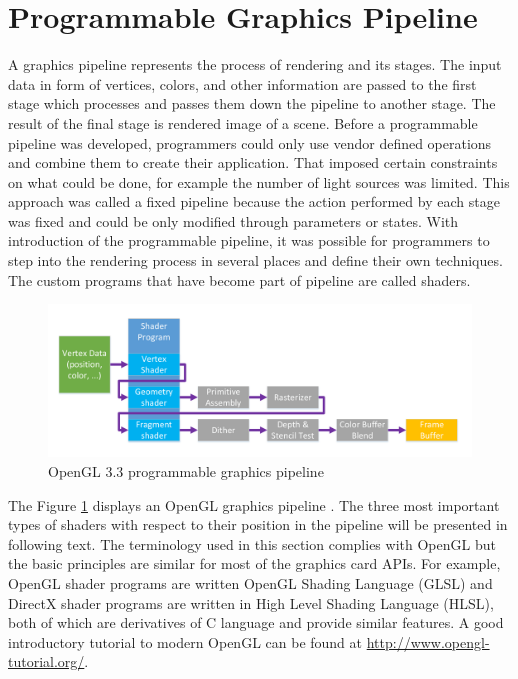 \section{Programmable Graphics Pipeline}
\label{sec:pipeline}
A graphics pipeline represents the process of rendering and its stages. The
input data in form of vertices, colors, and other information are passed to the
first stage which processes and passes them down the pipeline to another stage.
The result of the final stage is rendered image of a scene. Before a programmable
pipeline was developed, programmers could only use vendor defined operations and
combine them to create their application. That imposed certain constraints on
what could be done, for example the number of light sources was limited. This approach
was called a fixed pipeline because the action performed by each stage was fixed and could be only modified through parameters
or states. With introduction of the programmable pipeline, it was possible for
programmers to step into the rendering process in several places and define their
own techniques. The custom programs that have become part of pipeline are called
shaders. 
\begin{figure}[htb]
	\centering
	\includegraphics[width=1\linewidth]{fig/OpenGLpipeline.pdf}
	\caption{OpenGL 3.3 programmable graphics pipeline \cite{OpenGL}}
	\label{fig:OpenGLPipeline}
\end{figure}
The Figure \ref{fig:OpenGLPipeline} displays an OpenGL graphics pipeline \cite{OpenGL}. The three most important types of
shaders with respect to their position in the pipeline will be presented in following text. The terminology used in this section complies with OpenGL but the basic principles are similar for most of the graphics card APIs. For example, OpenGL shader programs are written OpenGL Shading Language (GLSL) and DirectX shader programs are written in High Level Shading Language (HLSL), both of which are derivatives of C language and provide similar features. A good introductory tutorial to modern OpenGL can be found at \url{http://www.opengl-tutorial.org/}.

